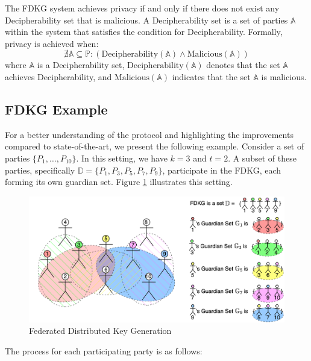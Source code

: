 \documentclass[runningheads]{llncs}
\begin{document}
\begin{definition}[Privacy] \label{def:privacy}
    The FDKG system achieves privacy if and only if there does not exist any Decipherability set that is malicious. A Decipherability set is a set of parties \( \mathbb{A} \) within the system that satisfies the condition for Decipherability. Formally, privacy is achieved when:
    \[
    \nexists \mathbb{A} \subseteq \mathbb{P} : (\text{Decipherability}(\mathbb{A}) \land \text{Malicious}(\mathbb{A}))
    \]
    where \( \mathbb{A} \) is a Decipherability set, \( \text{Decipherability}(\mathbb{A}) \) denotes that the set \( \mathbb{A} \) achieves Decipherability, and \( \text{Malicious}(\mathbb{A}) \) indicates that the set \( \mathbb{A} \) is malicious.
\end{definition}


\subsection{FDKG Example}

For a better understanding of the protocol and highlighting the improvements compared to state-of-the-art, we present the following example. Consider a set of parties $\{P_1, \ldots, P_{10}\}$. In this setting, we have $k = 3$ and $t = 2$. A subset of these parties, specifically $\mathbb{D} = \{P_1, P_3, P_5, P_7, P_9\}$, participate in the FDKG, each forming its own guardian set. Figure \ref{fig:FDKG} illustrates this setting.

\begin{figure}
    \centering
    \includegraphics[width=\textwidth]{FDKG2.png}
    \caption{Federated Distributed Key Generation}
    \label{fig:FDKG}
\end{figure}

The process for each participating party is as follows:
\end{document}
